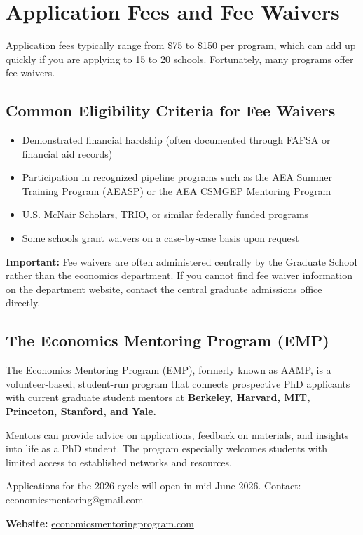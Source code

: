 \documentclass[11pt, letterpaper]{article}
\begin{document}
\section{Application Fees and Fee Waivers}\label{sec:fees}

Application fees typically range from \$75 to \$150 per program, which can add up quickly if you are applying to 15 to 20 schools. Fortunately, many programs offer fee waivers.

\subsection{Common Eligibility Criteria for Fee Waivers}

\begin{itemize}[leftmargin=*, itemsep=2pt]
    \item Demonstrated financial hardship (often documented through FAFSA or financial aid records)
    \item Participation in recognized pipeline programs such as the AEA Summer Training Program (AEASP) or the AEA CSMGEP Mentoring Program
    \item U.S. McNair Scholars, TRIO, or similar federally funded programs
    \item Some schools grant waivers on a case-by-case basis upon request
\end{itemize}

\textbf{Important:} Fee waivers are often administered centrally by the Graduate School rather than the economics department. If you cannot find fee waiver information on the department website, contact the central graduate admissions office directly.

\subsection{The Economics Mentoring Program (EMP)}

\begin{tipbox}
The Economics Mentoring Program (EMP), formerly known as AAMP, is a volunteer-based, student-run program that connects prospective PhD applicants with current graduate student mentors at \textbf{Berkeley, Harvard, MIT, Princeton, Stanford, and Yale.}

Mentors can provide advice on applications, feedback on materials, and insights into life as a PhD student. The program especially welcomes students with limited access to established networks and resources.

Applications for the 2026 cycle will open in mid-June 2026. Contact: economicsmentoring@gmail.com

\textbf{Website:} \href{https://www.economicsmentoringprogram.com/}{economicsmentoringprogram.com}
\end{tipbox}
\end{document}

